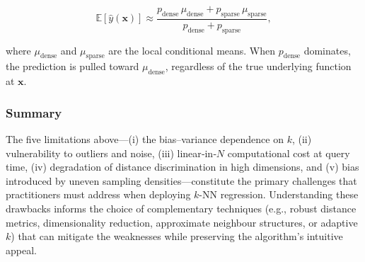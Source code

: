 \documentclass[12pt, a4paper]{article}
\begin{document}
\[
\mathbb{E}[\hat{y}(\mathbf{x})] \approx 
\frac{p_{\text{dense}}\,\mu_{\text{dense}} + p_{\text{sparse}}\,\mu_{\text{sparse}}}
     {p_{\text{dense}} + p_{\text{sparse}}},
\]

where \(\mu_{\text{dense}}\) and \(\mu_{\text{sparse}}\) are the local conditional means.  When \(p_{\text{dense}}\) dominates, the prediction is pulled toward \(\mu_{\text{dense}}\), regardless of the true underlying function at \(\mathbf{x}\).

\subsubsection{Summary}
The five limitations above—(i) the bias–variance dependence on \(k\), (ii) vulnerability to outliers and noise, (iii) linear‑in‑\(N\) computational cost at query time, (iv) degradation of distance discrimination in high dimensions, and (v) bias introduced by uneven sampling densities—constitute the primary challenges that practitioners must address when deploying \(k\)-NN regression.  Understanding these drawbacks informs the choice of complementary techniques (e.g., robust distance metrics, dimensionality reduction, approximate neighbour structures, or adaptive \(k\)) that can mitigate the weaknesses while preserving the algorithm’s intuitive appeal.
\end{document}
